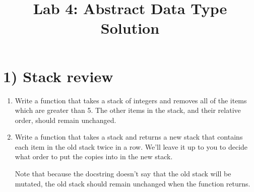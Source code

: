 \documentclass[12pt]{article}
\begin{document}
\title{Lab 4: Abstract Data Type Solution}
\date{}
\maketitle

\section*{1) Stack review}
\begin{enumerate}[1.]
    \item Write a function that takes a stack of integers and removes all of the items which are greater than 5.
    The other items in the stack, and their relative order, should remain unchanged.

    \item Write a function that takes a stack and returns a new stack that contains each item in the old stack twice in a row.
    We’ll leave it up to you to decide what order to put the copies into in the new stack.

    \bigskip

    Note that because the docstring doesn’t say that the old stack will be mutated,
    the old stack should remain unchanged when the function returns.
\end{enumerate}

\bigskip
\end{document}
